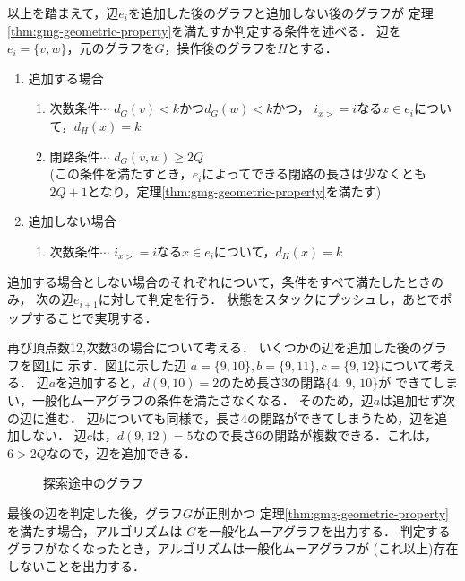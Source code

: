 以上を踏まえて，辺$e_i$を追加した後のグラフと追加しない後のグラフが
定理\ref{thm:gmg-geometric-property}を満たすか判定する条件を述べる．
辺を$e_i=\{v,w\}$，元のグラフを$G$，操作後のグラフを$H$とする．
\begin{enumerate}
\item 追加する場合
  \begin{enumerate}
  \item 次数条件$\cdots$ $d_G(v)<k$かつ$d_G(w)<k$かつ，
    $i_{x>}=i$なる$x\in e_i$について，$d_H(x)=k$
  \item 閉路条件$\cdots$ $d_G(v,w)\geq2Q$\\
    (この条件を満たすとき，$e_i$によってできる閉路の長さは少なくとも
    $2Q+1$となり，定理\ref{thm:gmg-geometric-property}を満たす)
  \end{enumerate}
\item 追加しない場合
  \begin{enumerate}
  \item 次数条件$\cdots$ $i_{x>}=i$なる$x\in e_i$について，$d_H(x)=k$
  \end{enumerate}
\end{enumerate}
追加する場合としない場合のそれぞれについて，条件をすべて満たしたときのみ，
次の辺$e_{i+1}$に対して判定を行う．
状態をスタックにプッシュし，あとでポップすることで実現する．

\begin{example}
  再び頂点数12,次数3の場合について考える．
  いくつかの辺を追加した後のグラフを図\ref{fig:feasible-edges-example2}に
  示す．図\ref{fig:feasible-edges-example2}に示した辺
  $a=\{9,10\},b=\{9,11\},c=\{9,12\}$について考える．
  辺$a$を追加すると，$d(9,10)=2$のため長さ3の閉路$\{4,\,9,\,10\}$が
  できてしまい，一般化ムーアグラフの条件を満たさなくなる．
  そのため，辺$a$は追加せず次の辺に進む．
  辺$b$についても同様で，長さ4の閉路ができてしまうため，辺を追加しない．
  辺$c$は，$d(9,12)=5$なので長さ6の閉路が複数できる．これは，
  $6>2Q$なので，辺を追加できる．
  \begin{figure}
    \centering
    \def\svgwidth{.5\textwidth}
    
    \caption{探索途中のグラフ}
    \label{fig:feasible-edges-example2}
  \end{figure}
\end{example}

最後の辺を判定した後，グラフ$G$が正則かつ
定理\ref{thm:gmg-geometric-property}を満たす場合，アルゴリズムは
$G$を一般化ムーアグラフを出力する．
判定するグラフがなくなったとき，アルゴリズムは一般化ムーアグラフが
(これ以上)存在しないことを出力する．

